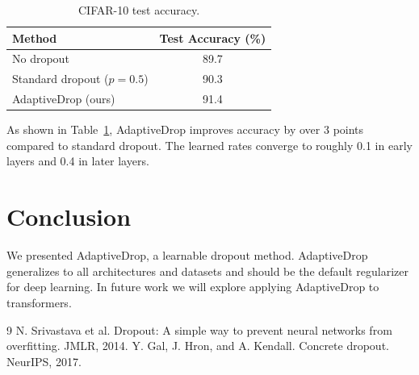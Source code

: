 \documentclass{article}
\begin{document}
\begin{table}[h]
\centering
\begin{tabular}{lc}
\toprule
Method & Test Accuracy (\%) \\
\midrule
No dropout & 89.7 \\
Standard dropout ($p=0.5$) & 90.3 \\
AdaptiveDrop (ours) & 91.4 \\
\bottomrule
\end{tabular}
\caption{CIFAR-10 test accuracy.}
\label{tab:results}
\end{table}

As shown in Table~\ref{tab:results}, AdaptiveDrop improves accuracy by over 3 points compared to standard dropout.
The learned rates converge to roughly 0.1 in early layers and 0.4 in later layers.

\section{Conclusion}
We presented AdaptiveDrop, a learnable dropout method.
AdaptiveDrop generalizes to all architectures and datasets and should be the default regularizer for deep learning.
In future work we will explore applying AdaptiveDrop to transformers.

\begin{thebibliography}{9}
 N. Srivastava et al. Dropout: A simple way to prevent neural networks from overfitting. JMLR, 2014.
 Y. Gal, J. Hron, and A. Kendall. Concrete dropout. NeurIPS, 2017.
\end{thebibliography}
\end{document}
